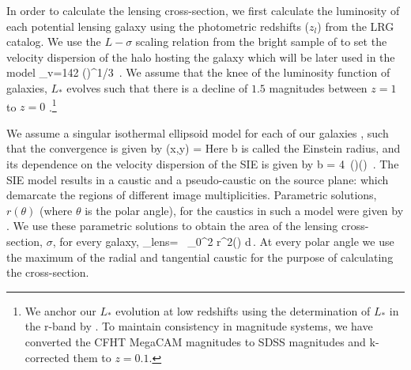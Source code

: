 \documentclass[useAMS,usenatbib,a4paper]{mn2e}
\begin{document}
In order to calculate the lensing cross-section, we first calculate the
luminosity of each potential lensing galaxy using the photometric redshifts
($z_l$) from the LRG catalog. We use the $L-\sigma$ scaling relation from the
bright sample of \citep{Parker2005} to set the velocity dispersion of the halo
hosting the galaxy which will be later used in the model
\be
\label{magstar2}
\sigma_v=142 \left(\right)^{1/3} \,.
\ee
We assume that the knee of the luminosity function of galaxies, $L_*$ evolves
such that there is a decline of $1.5$ magnitudes between $z=1$ to $z=0$
\citep{Faber2007}.\footnote{We anchor our $L_*$ evolution at low redshifts using the
determination of $L_*$ in the r-band by \citet{Blanton2001}. To maintain
consistency in magnitude systems, we have converted the CFHT MegaCAM magnitudes
to SDSS magnitudes and k-corrected them to $z=0.1$.}


%
%


We assume a singular isothermal ellipsoid model for each of our galaxies
\citep{Kormann1994}, such that the convergence is given by
\be
\kappa (x,y) = 
\ee
Here b is called the Einstein radius, and its dependence on the velocity
dispersion of the SIE is given by
\be
b = 4\pi\,
\left(\right)\left(\right) \,.
\ee
The SIE model results in a caustic and a pseudo-caustic on the source plane:
which demarcate the regions of different image multiplicities. Parametric
solutions, $r(\theta)$ (where $\theta$ is the polar angle), for the caustics in
such a model were given by \citet{Keeton2000b}. We use these parametric
solutions to obtain the area of the lensing cross-section, $\sigma$, for every
galaxy,
\be
\sigma_{\rm lens}= \, \int_0^{2\pi} r^2(\theta) d\theta\,.
\ee
At every polar angle we use the maximum of the radial and tangential caustic for
the purpose of calculating the cross-section.
\end{document}
